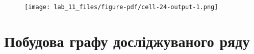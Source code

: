 \documentclass[
  letterpaper,
]{report}
\begin{document}
\begin{figure}[H]

{\centering \texttt{[image: lab\_11\_files/figure-pdf/cell-24-output-1.png]}

}

\end{figure}

\hypertarget{ux43fux43eux431ux443ux434ux43eux432ux430-ux433ux440ux430ux444ux443-ux434ux43eux441ux43bux456ux434ux436ux443ux432ux430ux43dux43eux433ux43e-ux440ux44fux434ux443}{%
\section{Побудова графу досліджуваного
ряду}\label{ux43fux43eux431ux443ux434ux43eux432ux430-ux433ux440ux430ux444ux443-ux434ux43eux441ux43bux456ux434ux436ux443ux432ux430ux43dux43eux433ux43e-ux440ux44fux434ux443}}
\end{document}
